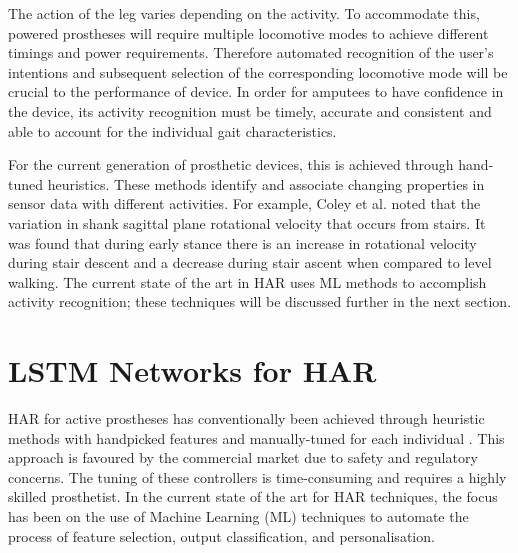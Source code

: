 \documentclass[sensors,article,submit,moreauthors,pdftex]{Definitions/mdpi}
\begin{document}
The action of the leg varies depending on the activity. To accommodate this, powered prostheses will require multiple locomotive modes to achieve different timings and power requirements. Therefore automated recognition of the user's intentions and subsequent selection of the corresponding locomotive mode will be crucial to the performance of device\cite{Tucker2015, Windrich2016, Zhang2015}. In order for amputees to have confidence in the device, its activity recognition must be timely, accurate and consistent and able to account for the individual gait characteristics.\cite{Pedroli2019, Sinha2011, Ponce2016}

For the current generation of prosthetic devices, this is achieved through hand-tuned heuristics. These methods identify and associate changing properties in sensor data with different activities. For example, Coley et al. noted that the variation in shank sagittal plane rotational velocity that occurs from stairs\cite{Coley2005}. It was found that during early stance there is an increase in rotational velocity during stair descent and a decrease during stair ascent when compared to level walking. The current state of the art in HAR uses ML methods to accomplish activity recognition; these techniques will be discussed further in the next section.




\section{LSTM Networks for HAR} 
\label{sec:lstm_therory}
HAR for active prostheses has conventionally been achieved through heuristic methods with handpicked features and manually-tuned for each individual \cite{Maqbool2017, Xu2018}. This approach is favoured by the commercial market due to safety and regulatory concerns\cite{Fluit2020}.  The tuning of these controllers is time-consuming and requires a highly skilled prosthetist. In the current state of the art for HAR techniques, the focus has been on the use of Machine Learning (ML) techniques to automate the process of feature selection, output classification, and personalisation\cite{Labarriere2020}.
\end{document}
